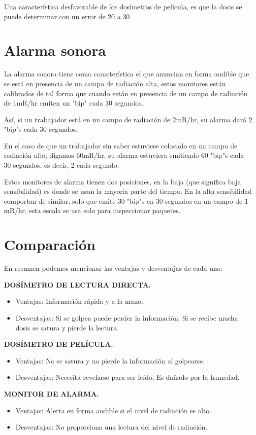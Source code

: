 Una característica desfavorable de los dosímetros de película, es que la dosis se puede determinar con un error de 20 a 30%

\section*{Alarma sonora}

La alarma sonora tiene como característica el que anuncian en forma audible que se está en presencia de un campo de radiación alta, estos monitores están calibrados de tal forma que cuando están en presencia de un campo de radiación de 1mR/hr emiten un "bip" cada 30 segundos.

Así, si un trabajador está en un campo de radiación de 2mR/hr, su alarma dará 2 "bip"s cada 30 segundos.

En el caso de que un trabajador sin saber estuviese colocado en un campo de radiación alto, digamos 60mR/hr, su alarma estuviera emitiendo 60 "bip"s cada 30 segundos, es decir, 2 cada segundo.

Estos monitores de alarma tienen dos posiciones, en la baja (que significa baja sensibilidad) es donde se usan la mayoría parte del tiempo. En la alta sensibilidad comportan de similar, solo que emite 30 "bip"s en 30 segundos en un campo de 1 mR/hr, esta escala se usa solo para inspeccionar paquetes.

\section*{Comparación}

En resumen podemos mencionar las ventajas y desventajas de cada uno:

\textbf{DOSÍMETRO DE LECTURA DIRECTA.}
\begin{itemize}
    \item Ventajas: Información rápida y a la mano.
    \item Desventajas: Si se golpea puede perder la información. Si se recibe mucha dosis se satura y pierde la lectura.
\end{itemize}

\textbf{DOSÍMETRO DE PELÍCULA.}
\begin{itemize}
    \item Ventajas: No se satura y no pierde la información al golpearse.
    \item Desventajas: Necesita revelarse para ser leído. Es dañado por la humedad.
\end{itemize}

\textbf{MONITOR DE ALARMA.}
\begin{itemize}
    \item Ventajas: Alerta en forma audible si el nivel de radiación es alto.
    \item Desventajas: No proporciona una lectura del nivel de radiación.
\end{itemize}
